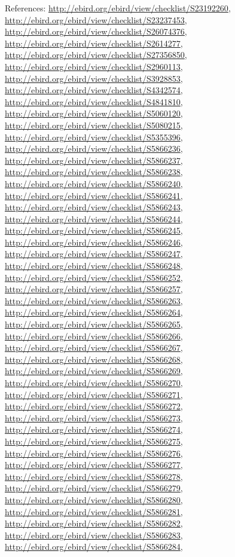 \documentclass[9pt, article]{memoir}
\begin{document}
\begin{multicols}{2}
References: 
\url{http://ebird.org/ebird/view/checklist/S23192260}, 
\url{http://ebird.org/ebird/view/checklist/S23237453}, 
\url{http://ebird.org/ebird/view/checklist/S26074376}, 
\url{http://ebird.org/ebird/view/checklist/S2614277}, 
\url{http://ebird.org/ebird/view/checklist/S27356850}, 
\url{http://ebird.org/ebird/view/checklist/S2960113}, 
\url{http://ebird.org/ebird/view/checklist/S3928853}, 
\url{http://ebird.org/ebird/view/checklist/S4342574}, 
\url{http://ebird.org/ebird/view/checklist/S4841810}, 
\url{http://ebird.org/ebird/view/checklist/S5060120}, 
\url{http://ebird.org/ebird/view/checklist/S5080215}, 
\url{http://ebird.org/ebird/view/checklist/S5355396}, 
\url{http://ebird.org/ebird/view/checklist/S5866236}, 
\url{http://ebird.org/ebird/view/checklist/S5866237}, 
\url{http://ebird.org/ebird/view/checklist/S5866238}, 
\url{http://ebird.org/ebird/view/checklist/S5866240}, 
\url{http://ebird.org/ebird/view/checklist/S5866241}, 
\url{http://ebird.org/ebird/view/checklist/S5866243}, 
\url{http://ebird.org/ebird/view/checklist/S5866244}, 
\url{http://ebird.org/ebird/view/checklist/S5866245}, 
\url{http://ebird.org/ebird/view/checklist/S5866246}, 
\url{http://ebird.org/ebird/view/checklist/S5866247}, 
\url{http://ebird.org/ebird/view/checklist/S5866248}, 
\url{http://ebird.org/ebird/view/checklist/S5866252}, 
\url{http://ebird.org/ebird/view/checklist/S5866257}, 
\url{http://ebird.org/ebird/view/checklist/S5866263}, 
\url{http://ebird.org/ebird/view/checklist/S5866264}, 
\url{http://ebird.org/ebird/view/checklist/S5866265}, 
\url{http://ebird.org/ebird/view/checklist/S5866266}, 
\url{http://ebird.org/ebird/view/checklist/S5866267}, 
\url{http://ebird.org/ebird/view/checklist/S5866268}, 
\url{http://ebird.org/ebird/view/checklist/S5866269}, 
\url{http://ebird.org/ebird/view/checklist/S5866270}, 
\url{http://ebird.org/ebird/view/checklist/S5866271}, 
\url{http://ebird.org/ebird/view/checklist/S5866272}, 
\url{http://ebird.org/ebird/view/checklist/S5866273}, 
\url{http://ebird.org/ebird/view/checklist/S5866274}, 
\url{http://ebird.org/ebird/view/checklist/S5866275}, 
\url{http://ebird.org/ebird/view/checklist/S5866276}, 
\url{http://ebird.org/ebird/view/checklist/S5866277}, 
\url{http://ebird.org/ebird/view/checklist/S5866278}, 
\url{http://ebird.org/ebird/view/checklist/S5866279}, 
\url{http://ebird.org/ebird/view/checklist/S5866280}, 
\url{http://ebird.org/ebird/view/checklist/S5866281}, 
\url{http://ebird.org/ebird/view/checklist/S5866282}, 
\url{http://ebird.org/ebird/view/checklist/S5866283}, 
\url{http://ebird.org/ebird/view/checklist/S5866284}, 

\end{multicols}
\end{document}
